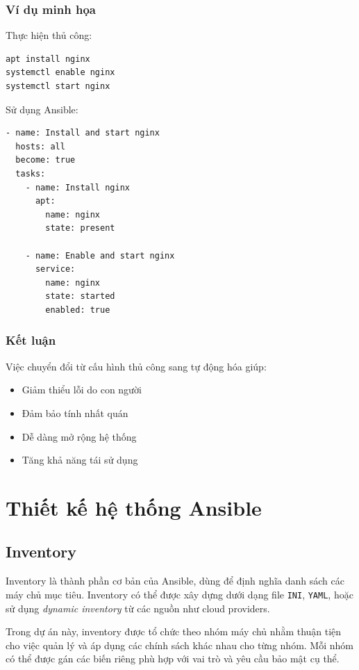 \subsubsection{Ví dụ minh họa}

\noindent Thực hiện thủ công:

\begin{verbatim}
apt install nginx
systemctl enable nginx
systemctl start nginx
\end{verbatim}

\noindent Sử dụng Ansible:

\begin{verbatim}
- name: Install and start nginx
  hosts: all
  become: true
  tasks:
    - name: Install nginx
      apt:
        name: nginx
        state: present

    - name: Enable and start nginx
      service:
        name: nginx
        state: started
        enabled: true
\end{verbatim}

\subsubsection{Kết luận}

\noindent Việc chuyển đổi từ cấu hình thủ công sang tự động hóa giúp:

\begin{itemize}
\item Giảm thiểu lỗi do con người
\item Đảm bảo tính nhất quán
\item Dễ dàng mở rộng hệ thống
\item Tăng khả năng tái sử dụng
\end{itemize}

\section{Thiết kế hệ thống Ansible}

\subsection{Inventory}

\noindent Inventory là thành phần cơ bản của Ansible, dùng để định nghĩa danh sách các máy chủ mục tiêu. Inventory có thể được xây dựng dưới dạng file \texttt{INI}, \texttt{YAML}, hoặc sử dụng \textit{dynamic inventory} từ các nguồn như cloud providers.

\noindent Trong dự án này, inventory được tổ chức theo nhóm máy chủ nhằm thuận tiện cho việc quản lý và áp dụng các chính sách khác nhau cho từng nhóm. Mỗi nhóm có thể được gán các biến riêng phù hợp với vai trò và yêu cầu bảo mật cụ thể.

